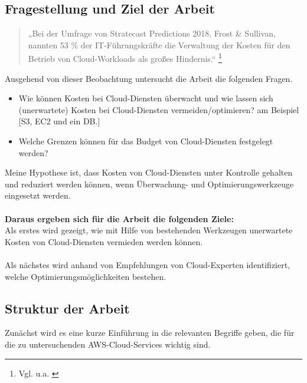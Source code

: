 \subsection{Fragestellung und Ziel der Arbeit}
\begin{quote}
„Bei der Umfrage von Stratecast Predictions 2018, Frost \& Sullivan, nannten 53 \% der IT-Führungskräfte die Verwaltung der Kosten für den Betrieb von Cloud-Workloads als großes Hindernis.“  
\footnote{Vgl. u.a. \cite{SP1}}
\end{quote}
Ausgehend von dieser Beobachtung untersucht die Arbeit die folgenden Fragen. 
\begin{itemize}
    \item
        Wie können Kosten bei Cloud-Diensten überwacht und wie lassen sich (unerwartete) Kosten bei Cloud-Diensten vermeiden/optimieren? am Beispiel [S3, EC2 und ein DB.]
    \item
        Welche Grenzen können für das Budget von Cloud-Diensten festgelegt werden?
\end{itemize}
Meine Hypothese ist, dass Kosten von Cloud-Diensten unter Kontrolle gehalten und
reduziert werden können, wenn Überwachung- und Optimierungswerkzeuge eingesetzt werden.
\\\\
\textbf{Daraus ergeben sich für die Arbeit die folgenden Ziele:}\\ 
Als erstes wird gezeigt, wie mit Hilfe von bestehenden Werkzeugen unerwartete Kosten von Cloud-Diensten vermieden werden können.\\\\
Als nächstes wird anhand von Empfehlungen von Cloud-Experten identifiziert, welche Optimierungsmöglichkeiten bestehen.\\
\newpage
\subsection{Struktur der Arbeit}
Zunächst wird es eine kurze Einführung in die relevanten Begriffe geben, die für die zu untersuchenden AWS-Cloud-Services wichtig sind.


